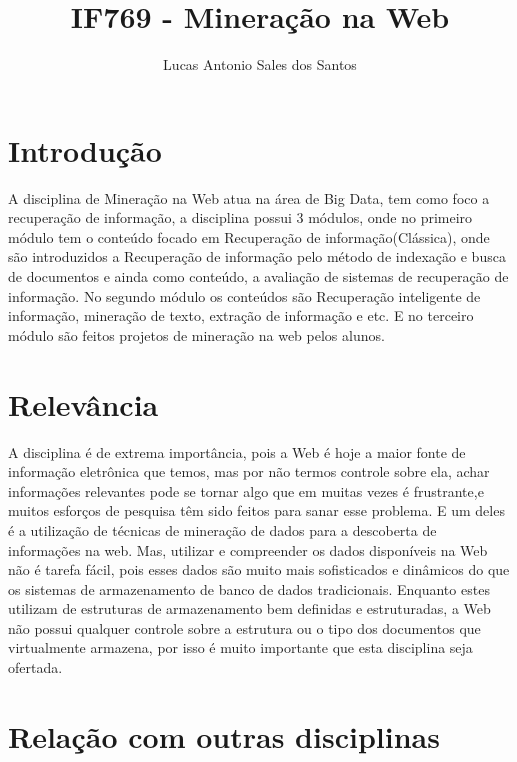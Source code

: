 \documentclass[10pt,a4paper] {article}
\title{IF769 - Mineração na Web}
\author{Lucas Antonio Sales dos Santos}
\begin{document}
	\maketitle	
	\centering
	\section{Introdução}
	\centering
A disciplina de Mineração na Web atua na área de Big Data, tem como foco a recuperação de informação, a disciplina possui 3 módulos, onde no primeiro módulo tem o conteúdo focado em Recuperação de informação(Clássica), onde são introduzidos a Recuperação de informação pelo método de indexação e busca de documentos e ainda como conteúdo, a avaliação de sistemas de recuperação de informação. No segundo módulo os conteúdos são Recuperação inteligente de informação, mineração de texto, extração de informação e etc. E no terceiro módulo são feitos projetos de mineração na web pelos alunos. 

	\section{Relevância}
	\centering
A disciplina é de extrema importância, pois a Web é hoje a maior fonte de informação eletrônica que temos, mas por não termos controle sobre ela, achar informações relevantes pode se tornar algo que em muitas vezes é frustrante,e muitos esforços de pesquisa têm sido feitos para sanar esse problema. E um deles é a utilização de técnicas de mineração de dados para a descoberta de informações na web. Mas, utilizar e compreender os dados disponíveis na Web não é tarefa fácil, pois esses dados são muito mais sofisticados e dinâmicos do que os sistemas de armazenamento de banco de dados tradicionais. Enquanto estes utilizam de estruturas de armazenamento bem definidas e estruturadas, a Web não possui qualquer controle sobre a estrutura ou o tipo dos documentos que virtualmente armazena, por isso é muito importante que esta disciplina seja ofertada.
\\ 

	\section{Relação com outras disciplinas}	
	
	

	\centering 
	
\end{document}
